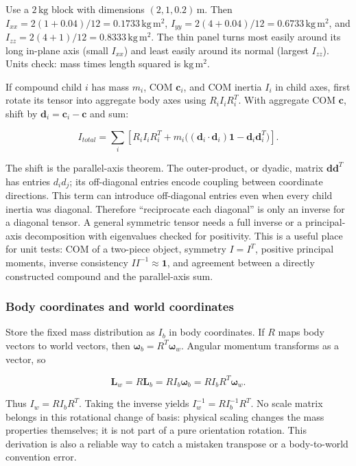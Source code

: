 Use a \(2\,\mathrm{kg}\) block with dimensions \((2,1,0.2)\,\mathrm m\). Then \(I_{xx}=2(1+0.04)/12=0.1733\,\mathrm{kg\,m^2}\), \(I_{yy}=2(4+0.04)/12=0.6733\,\mathrm{kg\,m^2}\), and \(I_{zz}=2(4+1)/12=0.8333\,\mathrm{kg\,m^2}\). The thin panel turns most easily around its long in-plane axis (small \(I_{xx}\)) and least easily around its normal (largest \(I_{zz}\)). Units check: mass times length squared is \(\mathrm{kg\,m^2}\).

If compound child \(i\) has mass \(m_i\), COM \(\mathbf c_i\), and COM inertia \(I_i\) in child axes, first rotate its tensor into aggregate body axes using \(R_iI_iR_i^T\). With aggregate COM \(\mathbf c\), shift by \(\mathbf d_i=\mathbf c_i-\mathbf c\) and sum:

\[
I_{total}=\sum_i\left[R_iI_iR_i^T+m_i\big((\mathbf d_i\cdot\mathbf d_i)\mathbf 1-\mathbf d_i\mathbf d_i^T\big)\right].
\]

The shift is the parallel-axis theorem. The outer-product, or dyadic, matrix \(\mathbf d\mathbf d^T\) has entries \(d_i d_j\); its off-diagonal entries encode coupling between coordinate directions. This term can introduce off-diagonal entries even when every child inertia was diagonal. Therefore ``reciprocate each diagonal'' is only an inverse for a diagonal tensor. A general symmetric tensor needs a full inverse or a principal-axis decomposition with eigenvalues checked for positivity. This is a useful place for unit tests: COM of a two-piece object, symmetry \(I=I^T\), positive principal moments, inverse consistency \(II^{-1}\approx\mathbf1\), and agreement between a directly constructed compound and the parallel-axis sum.

\subsubsection{Body coordinates and world coordinates}\label{06-engine-ii-ch034-body-coordinates-and-world-coordinates}

Store the fixed mass distribution as \(I_b\) in body coordinates. If \(R\) maps body vectors to world vectors, then \(\boldsymbol\omega_b=R^T\boldsymbol\omega_w\). Angular momentum transforms as a vector, so

\[
\mathbf L_w=R\mathbf L_b=RI_b\boldsymbol\omega_b=RI_bR^T\boldsymbol\omega_w.
\]

Thus \(I_w=RI_bR^T\). Taking the inverse yields \(I_w^{-1}=RI_b^{-1}R^T\). No scale matrix belongs in this rotational change of basis: physical scaling changes the mass properties themselves; it is not part of a pure orientation rotation. This derivation is also a reliable way to catch a mistaken transpose or a body-to-world convention error.

